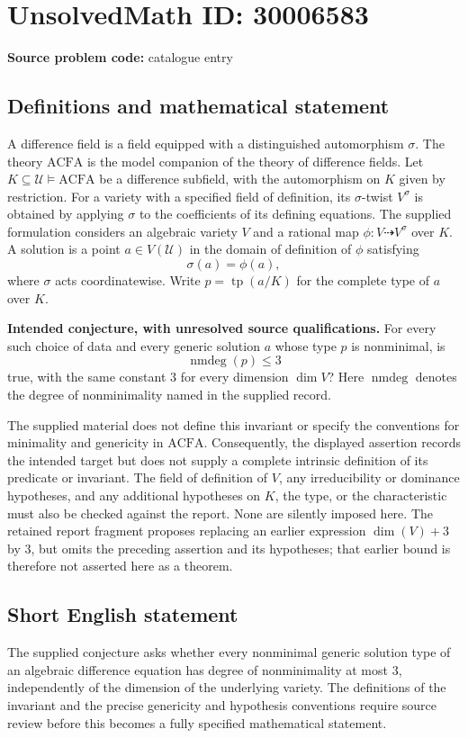 \documentclass[11pt]{article}
\begin{document}
\section*{UnsolvedMath ID: 30006583}
\textbf{Source problem code:} catalogue entry
\subsection{Definitions and mathematical statement}
A difference field is a field equipped with a distinguished automorphism \(\sigma\). The theory \(\mathrm{ACFA}\) is the model companion of the theory of difference fields. Let \(K\subseteq\mathcal U\models\mathrm{ACFA}\) be a difference subfield, with the automorphism on \(K\) given by restriction. For a variety with a specified field of definition, its \(\sigma\)-twist \(V^\sigma\) is obtained by applying \(\sigma\) to the coefficients of its defining equations. The supplied formulation considers an algebraic variety \(V\) and a rational map \(\phi:V\dashrightarrow V^\sigma\) over \(K\). A solution is a point \(a\in V(\mathcal U)\) in the domain of definition of \(\phi\) satisfying
\[
\sigma(a)=\phi(a),
\]
where \(\sigma\) acts coordinatewise. Write \(p=\operatorname{tp}(a/K)\) for the complete type of \(a\) over \(K\).

\textbf{Intended conjecture, with unresolved source qualifications.} For every such choice of data and every generic solution \(a\) whose type \(p\) is nonminimal, is
\[
\operatorname{nmdeg}(p)\leq 3
\]
true, with the same constant \(3\) for every dimension \(\dim V\)? Here \(\operatorname{nmdeg}\) denotes the degree of nonminimality named in the supplied record.

The supplied material does not define this invariant or specify the conventions for minimality and genericity in \(\mathrm{ACFA}\). Consequently, the displayed assertion records the intended target but does not supply a complete intrinsic definition of its predicate or invariant. The field of definition of \(V\), any irreducibility or dominance hypotheses, and any additional hypotheses on \(K\), the type, or the characteristic must also be checked against the report. None are silently imposed here. The retained report fragment proposes replacing an earlier expression \(\dim(V)+3\) by \(3\), but omits the preceding assertion and its hypotheses; that earlier bound is therefore not asserted here as a theorem.
\subsection{Short English statement}
The supplied conjecture asks whether every nonminimal generic solution type of an algebraic difference equation has degree of nonminimality at most \(3\), independently of the dimension of the underlying variety. The definitions of the invariant and the precise genericity and hypothesis conventions require source review before this becomes a fully specified mathematical statement.
\end{document}
